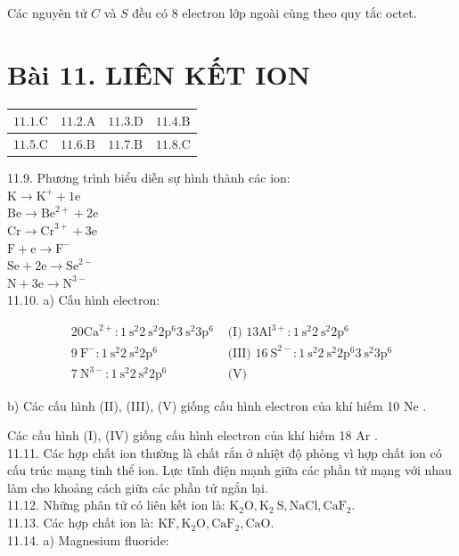 \documentclass[10pt]{article}
\begin{document}
Các nguyên tử $C$ và $S$ đều có 8 electron lớp ngoài cùng theo quy tắc octet.

\section*{Bài 11. LIÊN KẾT ION}
\begin{center}
\begin{tabular}{|l|l|l|l|}
\hline
$11.1 . \mathrm{C}$ & $11.2 . \mathrm{A}$ & $11.3 . \mathrm{D}$ & $11.4 . \mathrm{B}$ \\
\hline
$11.5 . \mathrm{C}$ & $11.6 . \mathrm{B}$ & $11.7 . \mathrm{B}$ & $11.8 . \mathrm{C}$ \\
\hline
\end{tabular}
\end{center}

11.9. Phương trình biểu diễn sự hình thành các ion:\\
$\mathrm{K} \rightarrow \mathrm{K}^{+}+1 \mathrm{e}$\\
$\mathrm{Be} \rightarrow \mathrm{Be}^{2+}+2 \mathrm{e}$\\
$\mathrm{Cr} \rightarrow \mathrm{Cr}^{3+}+3 \mathrm{e}$\\
$\mathrm{F}+\mathrm{e} \rightarrow \mathrm{F}^{-}$\\
$\mathrm{Se}+2 \mathrm{e} \rightarrow \mathrm{Se}^{2-}$\\
$\mathrm{N}+3 \mathrm{e} \rightarrow \mathrm{N}^{3-}$\\
11.10. a) Cấu hình electron:

\[
\begin{array}{lll}
20 \mathrm{Ca}^{2+}: 1 \mathrm{~s}^{2} 2 \mathrm{~s}^{2} 2 \mathrm{p}^{6} 3 \mathrm{~s}^{2} 3 \mathrm{p}^{6} & \text { (I) } 13 \mathrm{Al}^{3+}: 1 \mathrm{~s}^{2} 2 \mathrm{~s}^{2} 2 \mathrm{p}^{6} \\
9 \mathrm{~F}^{-}: 1 \mathrm{~s}^{2} 2 \mathrm{~s}^{2} 2 \mathrm{p}^{6} & \text { (III) } 16 \mathrm{~S}^{2-}: 1 \mathrm{~s}^{2} 2 \mathrm{~s}^{2} 2 \mathrm{p}^{6} 3 \mathrm{~s}^{2} 3 \mathrm{p}^{6} \\
7 \mathrm{~N}^{3-}: 1 \mathrm{~s}^{2} 2 \mathrm{~s}^{2} 2 \mathrm{p}^{6} & \text { (V) } \tag{IV}
\end{array}
\]

b) Các cấu hình (II), (III), (V) giống cấu hình electron của khí hiếm 10 Ne .

Các cấu hình (I), (IV) giống cấu hình electron của khí hiếm 18 Ar .\\
11.11. Các hợp chất ion thường là chất rắn ở nhiệt độ phòng vì hợp chất ion có cấu trúc mạng tinh thể ion. Lực tĩnh điện mạnh giữa các phần tử mạng với nhau làm cho khoảng cách giữa các phần tử ngắn lại.\\
11.12. Những phân tử có liên kết ion là: $\mathrm{K}_{2} \mathrm{O}, \mathrm{K}_{2} \mathrm{~S}, \mathrm{NaCl}, \mathrm{CaF}_{2}$.\\
11.13. Các hợp chất ion là: $\mathrm{KF}, \mathrm{K}_{2} \mathrm{O}, \mathrm{CaF}_{2}, \mathrm{CaO}$.\\
11.14. a) Magnesium fluoride:
\end{document}
